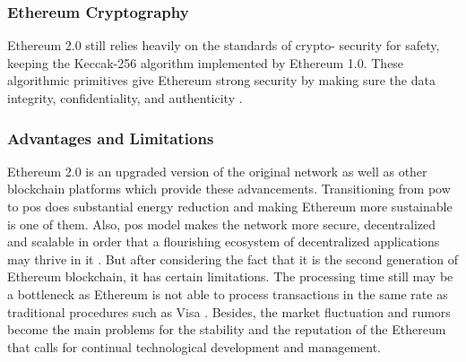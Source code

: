 \subsubsection{Ethereum Cryptography}

Ethereum 2.0 still relies heavily on the standards of crypto- security for safety, keeping the Keccak-256 algorithm implemented by Ethereum 1.0. These 
algorithmic primitives give Ethereum strong security by making sure the data integrity, confidentiality, and authenticity \cite{9129332}.

\subsubsection{Advantages and Limitations}

Ethereum 2.0 is an upgraded version of the original network as well as other blockchain platforms which provide these advancements. Transitioning from \gls{pow} to 
\gls{pos} does substantial energy reduction and making Ethereum more sustainable is one of them. Also, \gls{pos} model makes the network more secure, decentralized and 
scalable in order that a flourishing ecosystem of decentralized applications may thrive in it \cite{ethereumpos}. But after considering the fact that it is the second generation 
of Ethereum blockchain, it has certain limitations. The processing time still may be a bottleneck as Ethereum is not able to process transactions in the same 
rate as traditional procedures such as Visa \cite{9129332}. Besides, the market fluctuation and rumors become the main problems for the stability and the reputation of the 
Ethereum that calls for continual technological development and management.